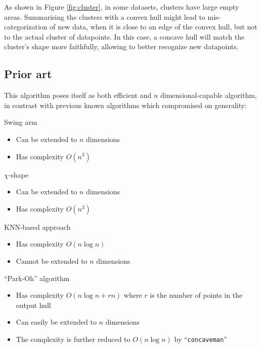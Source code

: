 \documentclass[a4paper]{article}
\newcommand{\ccvmn}{\lstinline{concaveman}}
\begin{document}
As shown in Figure \ref{fig:cluster}, in some datasets, clusters have large empty areas. Summarising the clusters with a convex hull might lead to mis-categorization of new data, when it is close to an edge of the convex hull, but not to the actual cluster of datapoints.
In this case, a concave hull will match the cluster's shape more faithfully, allowing to better recognize new datapoints.

\subsection{Prior art}

This algorithm poses itself as both efficient and $n$ dimensional-capable algorithm, in contrast with previous known algorithms which compromised on generality:

\begin{description}
    \item Swing arm\cite{10.1007/11863939_6}
    \begin{itemize}
        \item Can be extended to $n$ dimensions
        \item Has complexity $O(n^3)$
    \end{itemize}
    \item $\chi$-shape\cite{10.1016/j.patcog.2008.03.023}
    \begin{itemize}
        \item Can be extended to $n$ dimensions
        \item Has complexity $O(n^3)$
    \end{itemize}
    \item KNN-based approach\cite{10.1145/2505821.2505827}
    \begin{itemize}
        \item Has complexity $O(n\log n)$
        \item Cannot be extended to $n$ dimensions
    \end{itemize}
    \item ``Park-Oh'' algorithm
    \begin{itemize}
        \item Has complexity $O(n\log n+rn)$ where $r$ is the number of points in the output hull
        \item Can easily be extended to $n$ dimensions
        \item The complexity is further reduced to $O(n\log n)$ by ``\ccvmn''
    \end{itemize}
\end{description}
\end{document}
